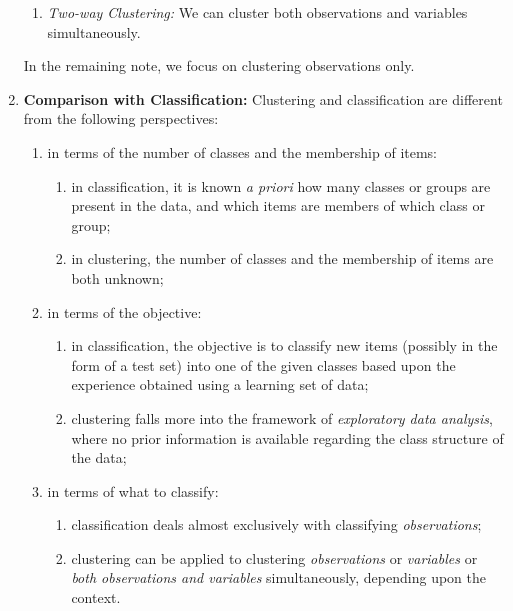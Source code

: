 \documentclass[12pt]{article}
\begin{document}
\begin{enumerate}[label=\textbf{\arabic*.}]
\begin{enumerate}
		\item \textit{Two-way Clustering:} We can cluster both observations and variables simultaneously. 
	
	\end{enumerate}
	
	In the remaining note, we focus on clustering observations only. 
	
	\item \textbf{Comparison with Classification:} Clustering and classification are different from the following perspectives: 
	\begin{enumerate}
		\item in terms of the number of classes and the membership of items: 
		\begin{enumerate}
			\item in classification, it is known \textit{a priori} how many classes or groups are present in the data, and which items are members of which class or group; 
			\item in clustering, the number of classes and the membership of items are both unknown; 
		\end{enumerate}
		\item in terms of the objective: 
		\begin{enumerate}
			\item in classification, the objective is to classify new items (possibly in the form of a test set) into one of the given classes based upon the experience obtained using a learning set of data; 
			\item clustering falls more into the framework of \emph{exploratory data analysis}, where no prior information is available regarding the class structure of the data; 
		\end{enumerate}
		\item in terms of what to classify: 
		\begin{enumerate}
			\item classification deals almost exclusively with classifying \textit{observations}; 
			\item clustering can be applied to clustering \emph{observations} or \emph{variables} or \emph{both observations and variables} simultaneously, depending upon the context. 
		\end{enumerate}
	\end{enumerate}
	

\end{enumerate}
\end{document}
